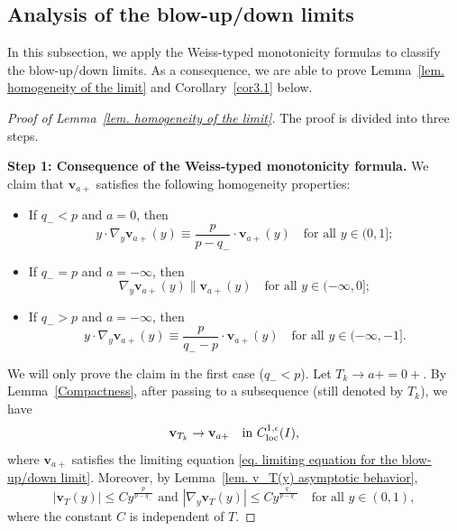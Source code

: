 \documentclass[11pt,twoside,reqno]{amsart}
\numberwithin{equation}{section}
\begin{document}
\subsection{Analysis of the blow-up/down limits}
In this subsection, we apply the Weiss-typed monotonicity formulas to classify the blow-up/down limits. As a consequence, we are able to prove Lemma~\ref{lem. homogeneity of the limit} and Corollary~\ref{cor3.1} below.
\begin{proof}[Proof of Lemma~\ref{lem. homogeneity of the limit}]
The proof is divided into three steps.

\textbf{Step 1: Consequence of the Weiss-typed monotonicity formula.} We claim that $\mathbf{v}_{a+}$ satisfies the following homogeneity properties:
\begin{itemize}
    \item[(1)] If $q_{-}<p$ and $a=0$, then
    \begin{equation*}
        y\cdot\nabla_{y}\mathbf{v}_{a+}(y)\equiv\frac{p}{p-q_{-}}\cdot\mathbf{v}_{a+}(y)\quad\mbox{for all }y\in(0,1];
    \end{equation*}
    \item[(2)] If $q_{-}=p$ and $a=-\infty$, then
    \begin{equation*}
        \nabla_{y}\mathbf{v}_{a+}(y)\parallel\mathbf{v}_{a+}(y)\quad\mbox{for all }y\in(-\infty,0];
    \end{equation*}
    \item[(3)] If $q_{-}>p$ and $a=-\infty$, then
    \begin{equation*}
        y\cdot\nabla_{y}\mathbf{v}_{a+}(y)\equiv\frac{p}{q_{-}-p}\cdot\mathbf{v}_{a+}(y)\quad\mbox{for all }y\in(-\infty,-1].
    \end{equation*}
\end{itemize}

We will only prove the claim in the first case ($q_{-}<p$). 
Let $T_k\to a+=0+$. By Lemma~\ref{Compactness}, after passing to a subsequence
(still denoted by $T_k$), we have
\[
\mathbf v_{T_k}\to\mathbf v_{a+}
\quad\text{in }C^{1,\epsilon}_{\rm loc}(I),
\]
where $\mathbf v_{a+}$ satisfies the limiting equation
\eqref{eq. limiting equation for the blow-up/down limit}. Moreover, by
Lemma~\ref{lem. v_T(y) asymptotic behavior},
\begin{equation*}
|\mathbf v_T(y)|\leq C y^{\frac{p}{p-q_-}}\mbox{ and }|\nabla_{y}\mathbf{v}_{T}(y)|\leq C y^{\frac{q_-}{p-q_-}}\quad\mbox{for all }y\in(0,1),
\end{equation*}
where the constant $C$ is independent of $T$. 


\end{proof}
\end{document}
